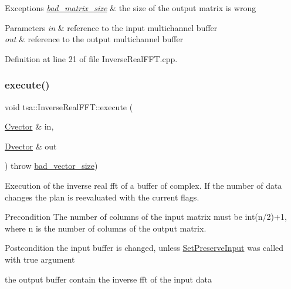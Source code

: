 \begin{DoxyExceptions}{Exceptions}
{\em \hyperlink{classtsa_1_1bad__matrix__size}{bad\+\_\+matrix\+\_\+size}} & the size of the output matrix is wrong\\
\hline
\end{DoxyExceptions}

\begin{DoxyParams}{Parameters}
{\em in} & reference to the input multichannel buffer \\
\hline
{\em out} & reference to the output multichannel buffer \\
\hline
\end{DoxyParams}


Definition at line 21 of file Inverse\+Real\+F\+F\+T.\+cpp.

\mbox{\label{classtsa_1_1_inverse_real_f_f_t_a2693642ff2282921710456dea0915b40}} 
\subsubsection{\texorpdfstring{execute()}{execute()}\hspace{0.1cm}{\footnotesize\ttfamily [2/4]}}
{\footnotesize\ttfamily void tsa\+::\+Inverse\+Real\+F\+F\+T\+::execute (\begin{DoxyParamCaption}\item[{\hyperlink{namespacetsa_a054d1045ead95a65819e9e5722baf600}{Cvector} \&}]{in,  }\item[{\hyperlink{namespacetsa_a8900fb03d849baf447a1a0efe2561fb2}{Dvector} \&}]{out }\end{DoxyParamCaption}) throw  \hyperlink{classtsa_1_1bad__vector__size}{bad\+\_\+vector\+\_\+size}) }

Execution of the inverse real fft of a buffer of complex. If the number of data changes the plan is reevaluated with the current flags.

\begin{DoxyPrecond}{Precondition}
The number of columns of the input matrix must be int(n/2)+1, where n is the number of columns of the output matrix.
\end{DoxyPrecond}
\begin{DoxyPostcond}{Postcondition}
the input buffer is changed, unless \hyperlink{classtsa_1_1_base_f_f_t_a5b1e2f36dbdfe197aa6c74d1cf963f40}{Set\+Preserve\+Input} was called with true argument 

the output buffer contain the inverse fft of the input data 
\end{DoxyPostcond}

